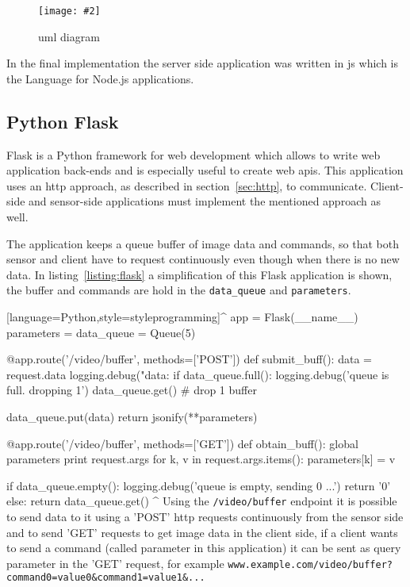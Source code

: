 \documentclass[hidelinks,11pt,a4paper,oneside,article]{memoir}
\newcommand{\putimage}[3][10] %
{
\begin{figure}[h]
	\centering
	\captionsetup{justification=centering}
	\texttt{[image: \#2]}
	\caption{#3}
	\label{fig:#2}
\end{figure}
}
\begin{document}
\clearpage
\putimage[15]{channel-uml}{\gls{uml} diagram}

In the final implementation the server side application was written in \gls{js} which is the Language for Node.js applications.




\subsection{Python Flask}
Flask is a Python framework for web development which allows to write web application back-ends and is especially useful to create web \gls{api}s. This application uses an \gls{http} approach, as described in section~\ref{sec:http}, to communicate. Client-side and sensor-side applications must implement the mentioned approach as well.

The application keeps a queue buffer of image data and commands, so that both sensor and client have to request continuously even though when there is no new data. In listing~\ref{listing:flask} a simplification of this Flask application is shown, the buffer and commands are hold in the \texttt{data\_queue} and \texttt{parameters}.

[language=Python,style=styleprogramming]^
app = Flask(__name__)
parameters = {}
data_queue = Queue(5)

@app.route('/video/buffer', methods=['POST'])
def submit_buff():
    data = request.data
    logging.debug("data:%
    if data_queue.full():
        logging.debug('queue is full. dropping 1')
        data_queue.get() # drop 1 buffer
    
    data_queue.put(data)
    return jsonify(**parameters)


@app.route('/video/buffer', methods=['GET'])
def obtain_buff():
    global parameters
    print request.args
    for k, v in request.args.items():
        parameters[k] = v
        
    if data_queue.empty():
        logging.debug('queue is empty, sending 0 ...')
        return '0'
    else:
        return data_queue.get()
^
Using the \texttt{/video/buffer} endpoint it is possible to send data to it using a 'POST' \gls{http} requests continuously from the sensor side and to send 'GET' requests to get image data in the client side, if a client wants to send a command (called parameter in this application) it can be sent as query parameter in the 'GET' request, for example \texttt{www.example.com/video/buffer?command0=value0\&command1=value1\&...}
\end{document}
